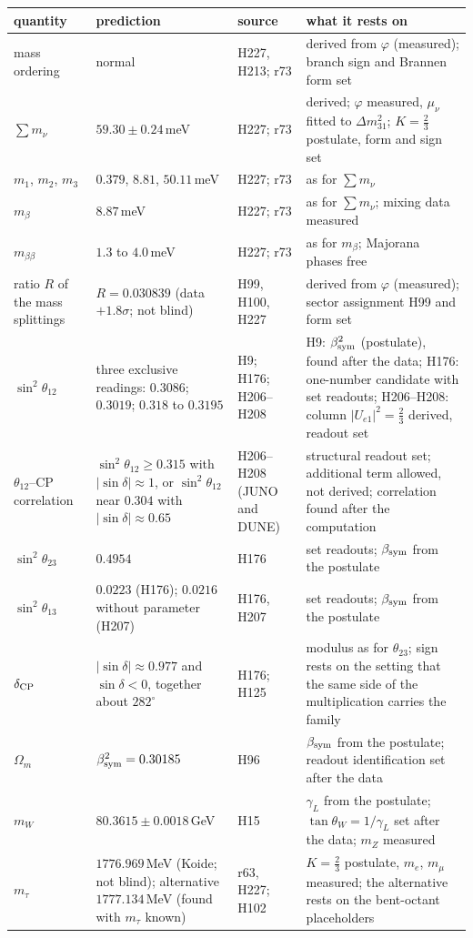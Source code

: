 \begin{center}
\small
\begin{tabular}{@{}p{2.5cm}p{4.0cm}p{2.3cm}p{4.7cm}@{}}
\hline
quantity & prediction & source & what it rests on\\
\hline
mass ordering & normal & H227, H213; r73 & derived from $\varphi$ (measured); branch sign and Brannen form set\\
$\sum m_\nu$ & $59.30\pm0.24$\,meV & H227; r73 & derived; $\varphi$ measured, $\mu_\nu$ fitted to $\Delta m^2_{31}$; $K=\tfrac23$ postulate, form and sign set\\
$m_1$, $m_2$, $m_3$ & $0.379$, $8.81$, $50.11$\,meV & H227; r73 & as for $\sum m_\nu$\\
$m_\beta$ & $8.87$\,meV & H227; r73 & as for $\sum m_\nu$; mixing data measured\\
$m_{\beta\beta}$ & $1.3$ to $4.0$\,meV & H227; r73 & as for $m_\beta$; Majorana phases free\\
ratio $R$ of the mass splittings & $R=0.030839$ (data $+1.8\sigma$; not blind) & H99, H100, H227 & derived from $\varphi$ (measured); sector assignment H99 and form set\\
$\sin^2\theta_{12}$ & three exclusive readings: $0.3086$; $0.3019$; $0.318$ to $0.3195$ & H9; H176; H206--H208 & H9: $\beta_{\rm sym}^2$ (postulate), found after the data; H176: one-number candidate with set readouts; H206--H208: column $|U_{e1}|^2=\tfrac23$ derived, readout set\\
$\theta_{12}$--CP correlation & $\sin^2\theta_{12}\geq0.315$ with $|\sin\delta|\approx1$, or $\sin^2\theta_{12}$ near $0.304$ with $|\sin\delta|\approx0.65$ & H206--H208 (JUNO and DUNE) & structural readout set; additional term allowed, not derived; correlation found after the computation\\
$\sin^2\theta_{23}$ & $0.4954$ & H176 & set readouts; $\beta_{\rm sym}$ from the postulate\\
$\sin^2\theta_{13}$ & $0.0223$ (H176); $0.0216$ without parameter (H207) & H176, H207 & set readouts; $\beta_{\rm sym}$ from the postulate\\
$\delta_{\rm CP}$ & $|\sin\delta|\approx0.977$ and $\sin\delta<0$, together about $282^\circ$ & H176; H125 & modulus as for $\theta_{23}$; sign rests on the setting that the same side of the multiplication carries the family\\
$\Omega_m$ & $\beta_{\rm sym}^2=0.30185$ & H96 & $\beta_{\rm sym}$ from the postulate; readout identification set after the data\\
$m_W$ & $80.3615\pm0.0018$\,GeV & H15 & $\gamma_L$ from the postulate; $\tan\theta_W=1/\gamma_L$ set after the data; $m_Z$ measured\\
$m_\tau$ & $1776.969$\,MeV (Koide; not blind); alternative $1777.134$\,MeV (found with $m_\tau$ known) & r63, H227; H102 & $K=\tfrac23$ postulate, $m_e$, $m_\mu$ measured; the alternative rests on the bent-octant placeholders\\
\hline
\end{tabular}
\end{center}

